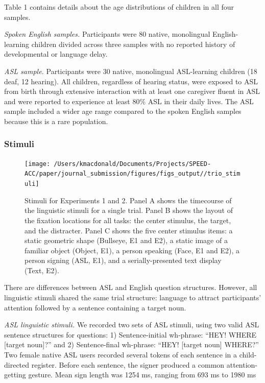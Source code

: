 \documentclass[english,floatsintext,man]{apa6}
\begin{document}
Table 1 contains details about the age distributions of children in all
four samples.

\emph{Spoken English samples.} Participants were 80 native, monolingual
English-learning children divided across three samples with no reported
history of developmental or language delay.

\emph{ASL sample.} Participants were 30 native, monolingual ASL-learning
children (18 deaf, 12 hearing). All children, regardless of hearing
status, were exposed to ASL from birth through extensive interaction
with at least one caregiver fluent in ASL and were reported to
experience at least 80\% ASL in their daily lives. The ASL sample
included a wider age range compared to the spoken English samples
because this is a rare population.

\hypertarget{stimuli}{%
\subsubsection{Stimuli}\label{stimuli}}

\begin{figure}[!t]

{\centering \texttt{[image: /Users/kmacdonald/Documents/Projects/SPEED-ACC/paper/journal\_submission/figures/figs\_output//trio\_stimuli]} 

}

\caption{Stimuli for Experiments 1 and 2. Panel A shows the timecourse of the linguistic stimuli for a single trial. Panel B shows the layout of the fixation locations for all tasks: the center stimulus, the target, and the distracter. Panel C shows the five center stimulus items: a static geometric shape (Bullseye, E1 and E2), a static image of a familiar object (Object, E1), a person speaking (Face, E1 and E2), a person signing (ASL, E1), and a serially-presented text display (Text, E2).}\label{fig:trio-stim}
\end{figure}

There are differences between ASL and English question structures.
However, all linguistic stimuli shared the same trial structure:
language to attract participants' attention followed by a sentence
containing a target noun.

\emph{ASL linguistic stimuli.} We recorded two sets of ASL stimuli,
using two valid ASL sentence structures for questions: 1)
Sentence-initial wh-phrase: \enquote{HEY! WHERE {[}target noun{]}?} and
2) Sentence-final wh-phrase: \enquote{HEY! {[}target noun{]} WHERE?} Two
female native ASL users recorded several tokens of each sentence in a
child-directed register. Before each sentence, the signer produced a
common attention-getting gesture. Mean sign length was 1254 ms, ranging
from 693 ms to 1980 ms
\end{document}
